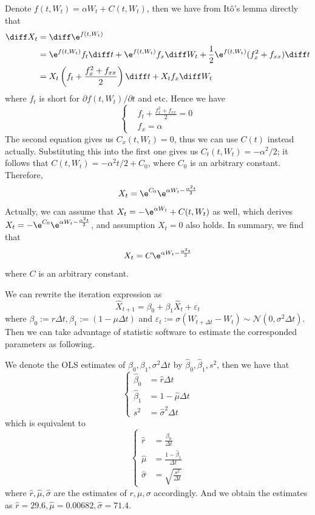     \problem
    Denote $f(t,W_t)=\alpha W_t+C(t,W_t)$, then we have from
    It\^o's lemma directly that
    \[\begin{aligned}
        \diff X_t&=\diff \e^{f(t,W_t)}\\
        &=\e^{f(t,W_t)}f_t\diff t+\e^{f(t,W_t)}f_x\diff W_t
        +\frac{1}{2}\e^{f(t,W_t)}(f_x^2+f_{xx})\diff t\\
        &=X_t\left(f_t+\frac{f_x^2+f_{xx}}{2}\right)\diff t
        +X_tf_x\diff W_t
    \end{aligned}\]
    where $f_t$ is short for $\partial f(t,W_t)/\partial t$ and etc.
    Hence we have
    \[\left\{\begin{aligned}
        &f_t+\frac{f_x^2+f_{xx}}{2}=0\\
        &f_x=\alpha
    \end{aligned}\right.\]
    The second equation gives us $C_x(t,W_t)=0$, thus we can use $C(t)$
    instead actually. Substituting this into the first one gives us
    $C_t(t,W_t)=-\alpha^2/2$; it follows that $C(t,W_t)=-\alpha^2 t/2+C_0$,
    where $C_0$ is an arbitrary constant.
    Therefore,
    \[X_t=\e^{C_0}\e^{\alpha W_t-\frac{\alpha^2t}{2}}\]
    Actually, we can assume that $X_t=-\e^{\alpha W_t}+C(t,W_t)$ as well,
    which derives $X_t=-\e^{C_0}\e^{\alpha W_t-\frac{\alpha^2t}{2}}$,
    and assumption $X_t=0$ also holds. In summary, we find that
    \[X_t=C\e^{\alpha W_t-\frac{\alpha^2t}{2}}\]
    where $C$ is an arbitrary constant.

    \problem
    We can rewrite the iteration expression as
    \[\hat X_{t+1}=
    \beta_0+\beta_1\hat X_t
    +\varepsilon_t\]
    where $\beta_0:=r\Delta t,\beta_1:=(1-\mu\Delta t)$
    and $\varepsilon_t:=\sigma(W_{t+\Delta t}-W_t)
    \sim\mathcal N(0,\sigma^2\Delta t)$.
    Then we can take advantage of statistic software to
    estimate the corresponded parameters as following.

    We denote the OLS estimates of $\beta_0,\beta_1,\sigma^2\Delta t$
    by $\hat\beta_0,\hat\beta_1,s^2$, then we have that
    \[\left\{\begin{aligned}
        \hat\beta_0&=\hat r\Delta t\\
        \hat\beta_1&=1-\hat\mu\Delta t\\
        s^2&=\hat\sigma^2\Delta t
    \end{aligned}\right.\]
    which is equivalent to
    \[\left\{\begin{aligned}
        \hat r&=\frac{\hat\beta_0}{\Delta t}\\
        \hat\mu&=\frac{1-\hat\beta_1}{\Delta t}\\
        \hat\sigma&=\sqrt{\frac{s^2}{\Delta t}}
    \end{aligned}\right.\]
    where $\hat r,\hat\mu,\hat\sigma$ are the estimates of $r,\mu,\sigma$
    accordingly.
    And we obtain the estimates as
    $\hat r=29.6,\hat\mu=0.00682,\hat\sigma=71.4$.

